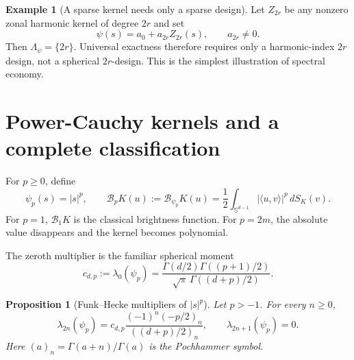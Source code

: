 \documentclass[12pt,a4paper]{article}
\newcommand{\Sph}{\mathbb S}
\newcommand{\cB}{\mathcal B}
\theoremstyle{plain}
\newtheorem{proposition}[theorem]{Proposition}
\theoremstyle{definition}
\newtheorem{example}[theorem]{Example}
\begin{document}
\begin{example}[A sparse kernel needs only a sparse design]\label{ex:sparse}
Let $Z_{2r}$ be any nonzero zonal harmonic kernel of degree $2r$ and set
\[
 \psi(s)=a_0+a_{2r}Z_{2r}(s),\qquad a_{2r}\ne0.
\]
Then $\Lambda_\psi=\{2r\}$.  Universal exactness therefore requires only a harmonic-index $2r$ design, not a spherical $2r$-design.  This is the simplest illustration of spectral economy.
\end{example}

\section{Power-Cauchy kernels and a complete classification}

For $p\ge0$, define
\[
 \psi_p(s)=|s|^p,
 \qquad
 \cB_pK(u):=\cB_{\psi_p}K(u)
 =\frac12\int_{\Sph^{d-1}}|\langle u,v\rangle|^p\,dS_K(v).
\]
For $p=1$, $\cB_1K$ is the classical brightness function.  For $p=2m$, the absolute value disappears and the kernel becomes polynomial.

The zeroth multiplier is the familiar spherical moment
\begin{equation}\label{eq:cdp}
 c_{d,p}:=\lambda_0(\psi_p)
 =\frac{\Gamma(d/2)\Gamma((p+1)/2)}{\sqrt\pi\,\Gamma((d+p)/2)}.
\end{equation}

\begin{proposition}[Funk--Hecke multipliers of $|s|^p$]\label{prop:power-multipliers}
Let $p>-1$.  For every $n\ge0$,
\begin{equation}\label{eq:power-multipliers}
 \lambda_{2n}(\psi_p)
 =c_{d,p}
 \frac{(-1)^n(-p/2)_n}{((d+p)/2)_n},
 \qquad
 \lambda_{2n+1}(\psi_p)=0.
\end{equation}
Here $(a)_n=\Gamma(a+n)/\Gamma(a)$ is the Pochhammer symbol.
\end{proposition}
\end{document}
